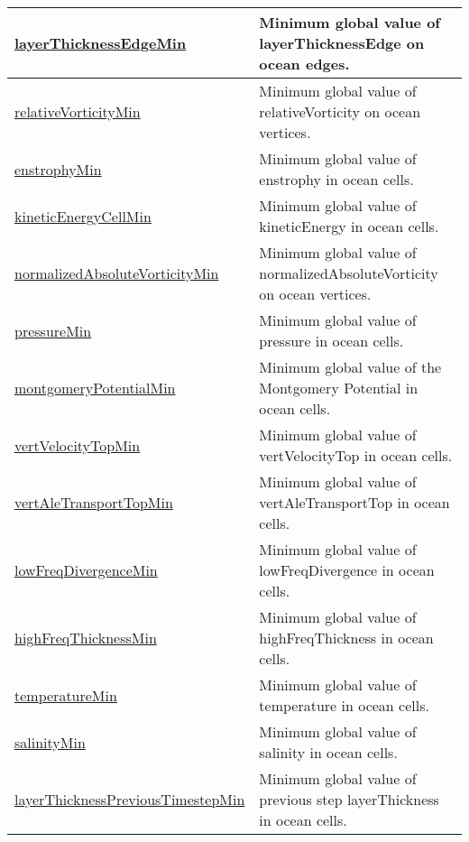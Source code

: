 {\begin{center}
\begin{longtable}{| p{2.0in} | p{4.0in} |}
    \hline
    \hyperref[subsec:var_sec_globalStatsAM_layerThicknessEdgeMin]{layerThicknessEdgeMin} & Minimum global value of layerThicknessEdge on ocean edges. \\
    \hline
    \hyperref[subsec:var_sec_globalStatsAM_relativeVorticityMin]{relativeVorticityMin} & Minimum global value of relativeVorticity on ocean vertices. \\
    \hline
    \hyperref[subsec:var_sec_globalStatsAM_enstrophyMin]{enstrophyMin} & Minimum global value of enstrophy in ocean cells. \\
    \hline
    \hyperref[subsec:var_sec_globalStatsAM_kineticEnergyCellMin]{kineticEnergyCellMin} & Minimum global value of kineticEnergy in ocean cells. \\
    \hline
    \hyperref[subsec:var_sec_globalStatsAM_normalizedAbsoluteVorticityMin]{normalizedAbsoluteVorticityMin} & Minimum global value of normalizedAbsoluteVorticity on ocean vertices. \\
    \hline
    \hyperref[subsec:var_sec_globalStatsAM_pressureMin]{pressureMin} & Minimum global value of pressure in ocean cells. \\
    \hline
    \hyperref[subsec:var_sec_globalStatsAM_montgomeryPotentialMin]{montgomeryPotentialMin} & Minimum global value of the Montgomery Potential in ocean cells. \\
    \hline
    \hyperref[subsec:var_sec_globalStatsAM_vertVelocityTopMin]{vertVelocityTopMin} & Minimum global value of vertVelocityTop in ocean cells. \\
    \hline
    \hyperref[subsec:var_sec_globalStatsAM_vertAleTransportTopMin]{vertAleTransportTopMin} & Minimum global value of vertAleTransportTop in ocean cells. \\
    \hline
    \hyperref[subsec:var_sec_globalStatsAM_lowFreqDivergenceMin]{lowFreqDivergenceMin} & Minimum global value of lowFreqDivergence in ocean cells. \\
    \hline
    \hyperref[subsec:var_sec_globalStatsAM_highFreqThicknessMin]{highFreqThicknessMin} & Minimum global value of highFreqThickness in ocean cells. \\
    \hline
    \hyperref[subsec:var_sec_globalStatsAM_temperatureMin]{temperatureMin} & Minimum global value of temperature in ocean cells. \\
    \hline
    \hyperref[subsec:var_sec_globalStatsAM_salinityMin]{salinityMin} & Minimum global value of salinity in ocean cells. \\
    \hline
    \hyperref[subsec:var_sec_globalStatsAM_layerThicknessPreviousTimestepMin]{layerThicknessPreviousTimestep\-Min} & Minimum global value of previous step layerThickness in ocean cells. \\

\end{longtable}
\end{center}}
